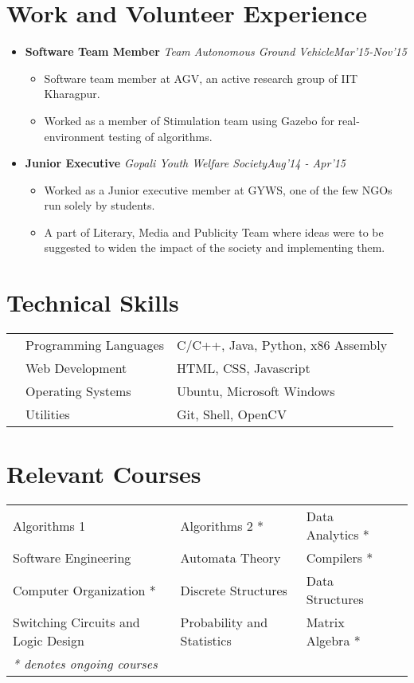 \documentclass[11pt,a4paper]{moderncv}
\newcommand{\experience}[4]{
  \vspace{0.1cm}
\item \textbf{\large{#1}} \textit{#2}\hfill\textit{#3}
  \begin{itemize}[leftmargin=*]
    \setlength\itemsep{0em} #4
  \end{itemize}
}
\begin{document}
\section*{Work and Volunteer Experience}
\begin{itemize}
  \setlength\itemsep{0.5em}

  \experience{Software Team Member}{Team Autonomous Ground Vehicle}{Mar'15-Nov'15}{
  \item	Software team member at AGV, an active research group of IIT Kharagpur.
  \item	Worked as a member of Stimulation team using Gazebo for real-environment testing of algorithms.
  }
    
  \experience{Junior Executive}{Gopali Youth Welfare Society}{Aug'14 - Apr'15}{
  \item Worked as a Junior executive member at GYWS, one of the few NGOs run solely by students.
  \item A part of Literary, Media and Publicity Team where ideas were to be suggested to widen the impact of the society and implementing them.
  }

\end{itemize}

\section*{Technical Skills}
\begin{tabular}{L{0.05cm} L{5cm} l}
  &Programming Languages      &C/C++, Java, Python, x86 Assembly\\
  &Web Development              &HTML, CSS, Javascript\\
  &Operating Systems	        &Ubuntu, Microsoft Windows\\
  &Utilities                  &Git, Shell, OpenCV\\
\end{tabular}

\section*{Relevant Courses}
\begin{tabular}{L{7.2cm} L{6.0cm} L{5.6cm}l}
  Algorithms 1 & Algorithms 2 * &
  Data Analytics * \\  Software Engineering & Automata Theory &  Compilers * \\
  Computer Organization *  & Discrete Structures & Data Structures\\
  Switching Circuits and Logic Design &
  Probability and Statistics & Matrix Algebra *\\
  \textit{* denotes ongoing courses} \\
\end{tabular}
\end{document}
